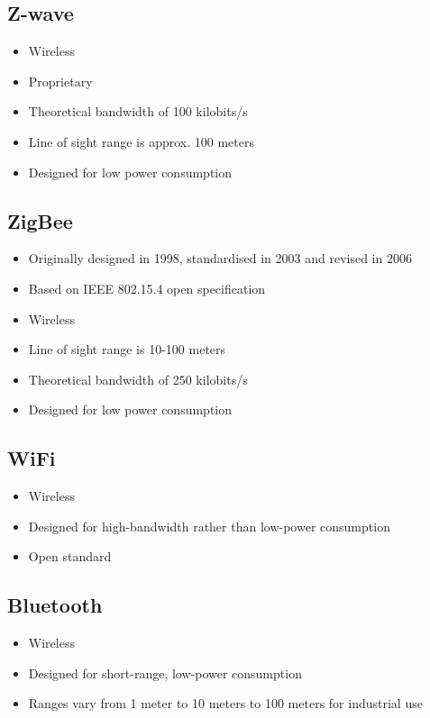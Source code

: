 \subsection{Z-wave} \cite{wiki_zwave}

\begin{itemize}
\item Wireless
\item Proprietary
\item Theoretical bandwidth of 100 kilobits/s
\item Line of sight range is approx. 100 meters
\item Designed for low power consumption
\end{itemize}


\subsection{ZigBee} \cite{wiki_zigbee}

\begin{itemize}
\item Originally designed in 1998, standardised in 2003 and revised in 2006
\item Based on IEEE 802.15.4 open specification
\item Wireless
\item Line of sight range is 10-100 meters
\item Theoretical bandwidth of 250 kilobits/s
\item Designed for low power consumption
\end{itemize}

\subsection{WiFi} \cite{wiki_wifi}

\begin{itemize}
\item Wireless
\item Designed for high-bandwidth rather than low-power consumption
\item Open standard
\end{itemize}


\subsection{Bluetooth} \cite{wiki_bluetooth}

\begin{itemize}
\item Wireless
\item Designed for short-range, low-power consumption
\item Ranges vary from 1 meter to 10 meters to 100 meters for industrial use
\end{itemize}

